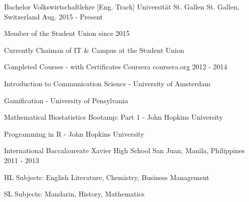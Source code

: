 \begin{cventries}

  \cventry
    {Bachelor Volkswirtschaftlehre [Eng. Track]} %
    {Universität St. Gallen} %
    {St. Gallen, Switzerland} %
    {Aug. 2015 - Present} %
    {
      \begin{cvitems} %
        \item {Member of the Student Union since 2015}
        \item {Currently Chaiman of IT \& Campus at the Student Union}
      \end{cvitems}
    }

  \cventry
  {Completed Courses - with Certificates} %
  {Coursera} %
  {coursera.org} %
  {2012 - 2014} %
  {
    \begin{cvitems} %
        \item {Introduction to Communication Science - University of Amsterdam}
        \item {Gamification - University of Pensylvania}
        \item {Mathematical Biostatistics Bootamp: Part 1 - John Hopkins University}
        \item {Programming in R - John Hopkins University}
    \end{cvitems}
  }

  \cventry
    {International Baccalaureate} %
    {Xavier High School} %
    {San Juan, Manila, Philippines} %
    {2011 - 2013} %
    {
      \begin{cvitems} %
        \item {HL Subjects: English Literature, Chemistry, Business Management }
        \item {SL Subjects: Mandarin, History, Mathematics }
      \end{cvitems}
    }

\end{cventries}
